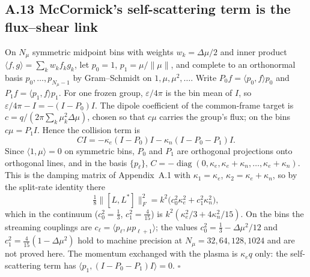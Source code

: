 \subsection*{A.13 McCormick's self-scattering term is the flux--shear link}
On $N_\mu$ symmetric midpoint bins with weights $w_k=\Delta\mu/2$ and inner product $\langle f,g\rangle=\sum_kw_kf_kg_k$, let $p_0=1$, $p_1=\mu/\lVert\mu\rVert$, and complete to an orthonormal basis $p_0,\dots,p_{N_\mu-1}$ by Gram--Schmidt on $1,\mu,\mu^2,\dots$. Write $P_0f=\langle p_0,f\rangle p_0$ and $P_1f=\langle p_1,f\rangle p_1$. For one frozen group, $\varepsilon/4\pi$ is the bin mean of $I$, so $\varepsilon/4\pi-I=-(I-P_0)I$. The dipole coefficient of the common-frame target is $c=q/(2\pi\sum_k\mu_k^2\Delta\mu)$, chosen so that $c\mu$ carries the group's flux; on the bins $c\mu=P_1I$. Hence the collision term is
\[C I=-\kappa_e(I-P_0)I-\kappa_n(I-P_0-P_1)I .\]
Since $\langle1,\mu\rangle=0$ on symmetric bins, $P_0$ and $P_1$ are orthogonal projections onto orthogonal lines, and in the basis $\{p_\ell\}$, $C=-\operatorname{diag}(0,\kappa_e,\kappa_e+\kappa_n,\dots,\kappa_e+\kappa_n)$. This is the damping matrix of Appendix~A.1 with $\kappa_1=\kappa_e$, $\kappa_2=\kappa_e+\kappa_n$, so by the split-rate identity there
\[\tfrac18\lVert[L,L^\ast]\rVert_F^2=k^2\bigl(c_0^2\kappa_e^2+c_1^2\kappa_n^2\bigr),\]
which in the continuum ($c_0^2=\tfrac13$, $c_1^2=\tfrac4{15}$) is $k^2(\kappa_e^2/3+4\kappa_n^2/15)$. On the bins the streaming couplings are $c_\ell=\langle p_\ell,\mu p_{\ell+1}\rangle$; the values $c_0^2=\tfrac13-\Delta\mu^2/12$ and $c_1^2=\tfrac4{15}(1-\Delta\mu^2)$ hold to machine precision at $N_\mu=32,64,128,1024$ and are not proved here. The momentum exchanged with the plasma is $\kappa_eq$ only: the self-scattering term has $\langle p_1,(I-P_0-P_1)I\rangle=0$. $\square$

